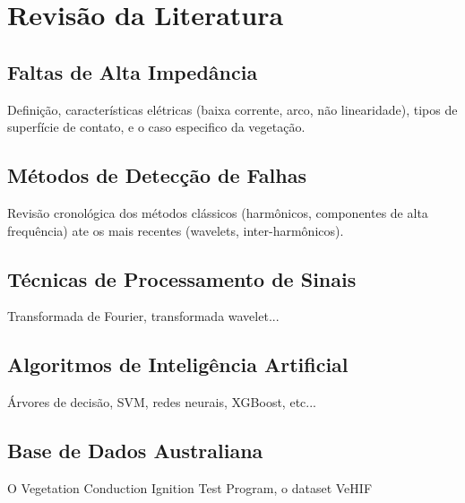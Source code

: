 %
%
\chapter{Revisão da Literatura}\label{chap:revbibliografica}

\section{Faltas de Alta Impedância}

Definição, características elétricas (baixa corrente, arco, não linearidade), tipos de superfície de contato, e o caso especifico da vegetação.

\section{Métodos de Detecção de Falhas}

Revisão cronológica dos métodos clássicos (harmônicos, componentes de alta frequência) ate os mais recentes (wavelets, inter-harmônicos).

\section{Técnicas de Processamento de Sinais}

Transformada de Fourier, transformada wavelet...

\section{Algoritmos de Inteligência Artificial}

Árvores de decisão, SVM, redes neurais, XGBoost, etc...

\section{Base de Dados Australiana}

O Vegetation Conduction Ignition Test Program, o dataset VeHIF